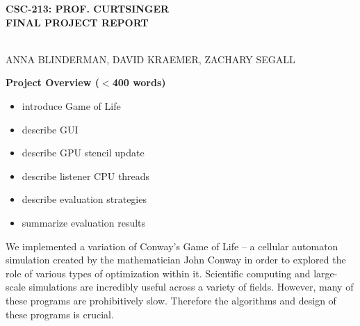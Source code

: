 \documentclass[12pt]{article}
\begin{document}
\setlength{\parindent}{3em}
\setlength{\parskip}{1em}


\newcommand{\ttspc}{\hspace{1mm}}
\newcommand{\tspc}{\hspace{2mm}}
\newcommand{\lspc}{\hspace{10mm}}
\newcommand{\ttc}{, \ttspc}
\newcommand{\nth}{^{\text{th}}}
\newcommand{\mybegit}{\vspace{-2mm} \begin{itemize} \itemsep-.6em }
\newcommand{\mytitle}[1]{\vspace{10mm} \noindent\begin{large} \textbf{{#1}} \end{large}} 
\newcommand{\soutt}[1]{%
    \renewcommand{\ULthickness}{1.0pt}%
       \sout{#1}%
    \renewcommand{\ULthickness}{.4pt}%
}



\begin{center}
\begin{Large} \textbf{CSC-213: PROF. CURTSINGER} \\
\vspace{3mm} \textbf{FINAL PROJECT REPORT} \end{Large} \\
\vspace{5mm} ANNA BLINDERMAN, DAVID KRAEMER, ZACHARY SEGALL
\end{center} 

\mytitle{Project Overview ($<$400 words)}
\mybegit
	\item introduce Game of Life
	\item describe GUI
	\item describe GPU stencil update
	\item describe listener CPU threads
	\item describe evaluation strategies
	\item summarize evaluation results
\end{itemize}

	We implemented a variation of Conway's Game of Life -- a cellular automaton simulation created by the mathematician John Conway in order to explored the role of various types of optimization within it. Scientific computing and large-scale simulations are incredibly useful across a variety of fields. However, many of these programs are prohibitively slow. Therefore the algorithms and design of these programs is crucial.
	
\end{document}
